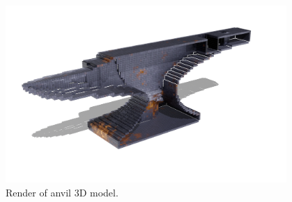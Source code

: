 \begin{figure}[htp]
    \centering
    \includegraphics[width=0.95\textwidth]{sections/result/figures/anvil-voxelized-clipped-v1-color-128.png}
    \caption{Render of anvil 3D model.}
    \label{fig:result-anvil-voxelization-cut}
\end{figure}

\clearpage
